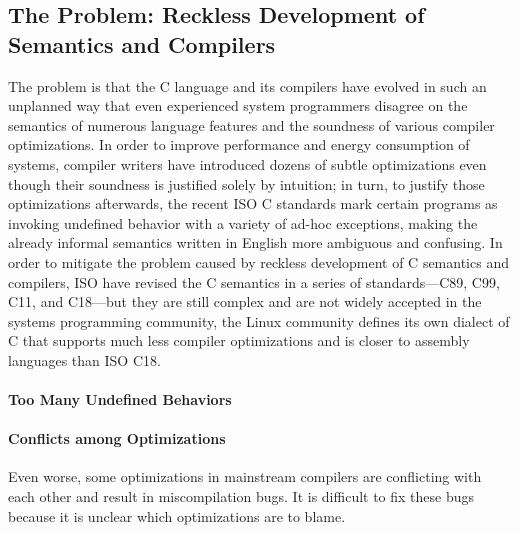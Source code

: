 


\subsection{The Problem: Reckless Development of Semantics and Compilers}
\label{sec:introduction:problem}

The problem is that the C language and its compilers have evolved in such an unplanned way that even
experienced system programmers disagree on the semantics of numerous language features and the
soundness of various compiler optimizations.  In order to improve performance and energy consumption
of systems, compiler writers have introduced dozens of subtle optimizations even though their
soundness is justified solely by intuition; in turn, to justify those optimizations afterwards, the
recent ISO C standards mark certain programs as invoking undefined behavior with a variety of ad-hoc
exceptions, making the already informal semantics written in English more ambiguous and confusing.
In order to mitigate the problem caused by reckless development of C semantics and compilers, ISO
have revised the C semantics in a series of standards---C89, C99, C11, and C18---but they are still
complex and are not widely accepted in the systems programming community, \eg{} the Linux community
defines its own dialect of C that supports much less compiler optimizations and is closer to
assembly languages than ISO C18.


\paragraph{Too Many Undefined Behaviors}



\paragraph{Conflicts among Optimizations}

Even worse, some optimizations in mainstream compilers are conflicting with each other and result in
miscompilation bugs.  It is difficult to fix these bugs because it is unclear which optimizations
are to blame.

